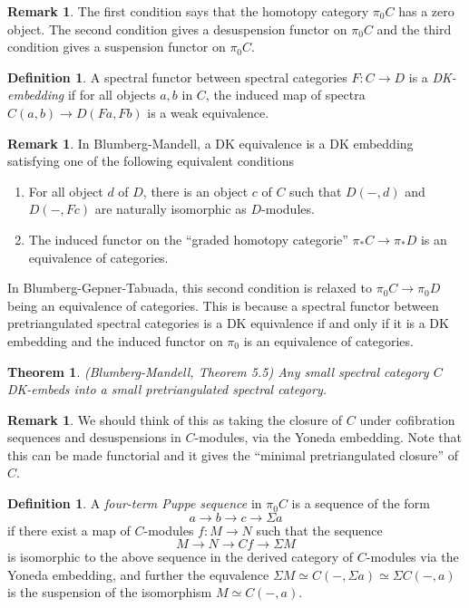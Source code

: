 \documentclass[letterpaper]{article}
\newtheorem{theorem}{Theorem}
\theoremstyle{definition}
\newtheorem{definition}[lemma]{Definition}
\newtheorem{remark}[lemma]{Remark}
\begin{document}
\begin{remark}
The first condition says that the homotopy category $\pi_0 C$ has a zero object. The second condition gives a desuspension functor on $\pi_0 C$ and the third condition gives a suspension functor on $\pi_0 C$.
\end{remark}

\begin{definition}
A spectral functor between spectral categories $F : C \rightarrow D$ is a \textit{DK-embedding} if for all objects $a,b$ in $C$, the induced map of spectra
$C(a,b) \rightarrow D(Fa,Fb)$ is a weak equivalence.
\end{definition}

\begin{remark}
In Blumberg-Mandell, a DK equivalence is a DK embedding satisfying one of the following equivalent conditions
\begin{enumerate}
\item For all object $d$ of $D$, there is an object $c$ of $C$ such that $D(-,d)$ and $D(-,Fc)$ are naturally isomorphic as $D$-modules.
\item The induced functor on the ``graded homotopy categorie'' $\pi_* C \rightarrow \pi_* D$ is an equivalence of categories.
\end{enumerate}
In Blumberg-Gepner-Tabuada, this second condition is relaxed to $\pi_0 C \rightarrow \pi_0 D$ being an equivalence of categories. This is because a spectral functor between pretriangulated spectral categories is a DK equivalence if and only if it is a DK embedding and the induced functor on $\pi_0$ is an equivalence of categories.
\end{remark}

\begin{theorem}(Blumberg-Mandell, Theorem 5.5)
Any small spectral category $C$ DK-embeds into a small pretriangulated spectral category.
\end{theorem}

\begin{remark}
We should think of this as taking the closure of $C$ under cofibration sequences and desuspensions in $C$-modules, via the Yoneda embedding. Note that this can be made functorial and it gives the ``minimal pretriangulated closure'' of $C$.
\end{remark}

\begin{definition}
A \textit{four-term Puppe sequence} in $\pi_0 C$ is a sequence of the form
$$a \rightarrow b \rightarrow c \rightarrow \Sigma a$$
if there exist a map of $C$-modules $f : M \rightarrow N$ such that the sequence
$$M \rightarrow N \rightarrow Cf \rightarrow \Sigma M$$
is isomorphic to the above sequence in the derived category of $C$-modules via the Yoneda embedding, and further the equvalence $\Sigma M \simeq C(-,\Sigma a) \simeq \Sigma C(-,a)$ is the suspension of the isomorphism $M \simeq C(-,a)$.
\end{definition}
\end{document}
